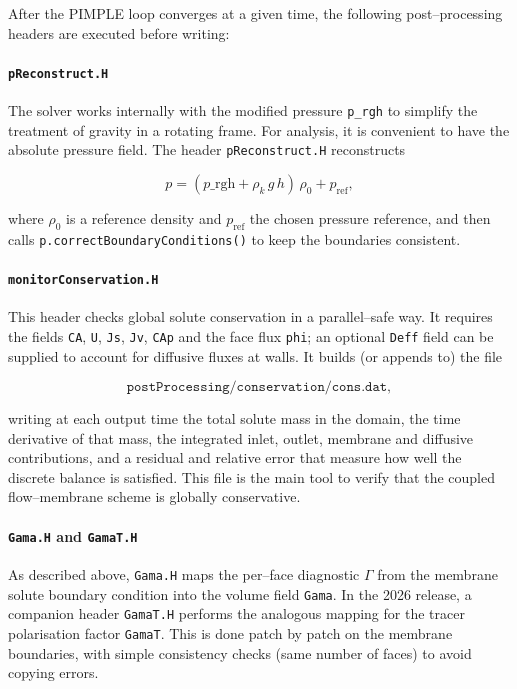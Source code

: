 \documentclass[11pt,a4paper]{article}
\begin{document}
After the PIMPLE loop converges at a given time, the following
post--processing headers are executed before writing:

\paragraph{\texttt{pReconstruct.H}}

The solver works internally with the modified pressure \texttt{p\_rgh}
to simplify the treatment of gravity in a rotating frame. For analysis,
it is convenient to have the absolute pressure field. The header
\texttt{pReconstruct.H} reconstructs

\[
p = (p\_\text{rgh} + \rho_k\,g\,h)\,\rho_0 + p_\text{ref},
\]

where \(\rho_0\) is a reference density and \(p_\text{ref}\) the chosen
pressure reference, and then calls \texttt{p.correctBoundaryConditions()}
to keep the boundaries consistent.

\paragraph{\texttt{monitorConservation.H}}

This header checks global solute conservation in a parallel--safe way.
It requires the fields \texttt{CA}, \texttt{U}, \texttt{Js},
\texttt{Jv}, \texttt{CAp} and the face flux \texttt{phi}; an optional
\texttt{Deff} field can be supplied to account for diffusive fluxes at
walls. It builds (or appends to) the file

\[
\texttt{postProcessing/conservation/cons.dat},
\]

writing at each output time the total solute mass in the domain, the
time derivative of that mass, the integrated inlet, outlet, membrane and
diffusive contributions, and a residual and relative error that measure
how well the discrete balance is satisfied. This file is the main tool
to verify that the coupled flow--membrane scheme is globally
conservative.

\paragraph{\texttt{Gama.H} and \texttt{GamaT.H}}

As described above, \texttt{Gama.H} maps the per--face diagnostic
\(\Gamma\) from the membrane solute boundary condition into the volume field
\texttt{Gama}.  In the 2026 release, a companion header \texttt{GamaT.H}
performs the analogous mapping for the tracer polarisation factor \texttt{GamaT}.
This is done patch by patch on the membrane boundaries, with simple consistency checks (same number of faces) to avoid copying errors.
\end{document}
